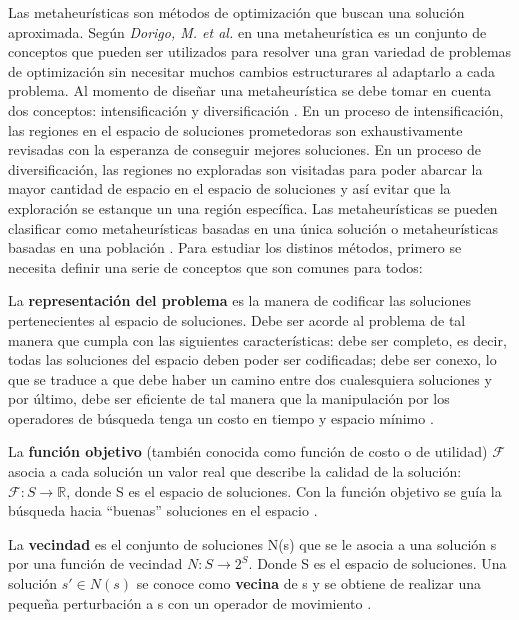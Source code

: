 Las metaheurísticas son métodos de optimización que buscan una solución aproximada. Según \emph{Dorigo, M. et al.} en \cite{Dorigo2017} una metaheurística es un conjunto de conceptos que pueden ser utilizados para resolver una gran variedad de problemas de optimización sin necesitar muchos cambios estructurares al adaptarlo a cada problema. Al momento de diseñar una metaheurística se debe tomar en cuenta dos conceptos: intensificación y diversificación \cite{talbi2009metaheuristics}. En un proceso de intensificación, las regiones en el espacio de soluciones prometedoras son exhaustivamente revisadas con la esperanza de conseguir mejores soluciones. En un proceso de diversificación, las regiones no exploradas son visitadas para poder abarcar la mayor cantidad de espacio en el espacio de soluciones y así evitar que la exploración se estanque un una región específica. Las metaheurísticas se pueden clasificar como metaheurísticas basadas en una única solución o metaheurísticas basadas en una población \cite{talbi2009metaheuristics}. Para estudiar los distinos métodos, primero se necesita definir una serie de conceptos que son comunes para todos:\\

\begin{definicion}
La \textbf{representación del problema} es la manera de codificar las soluciones pertenecientes al espacio de soluciones. Debe ser acorde al problema de tal manera que cumpla con las siguientes características: debe ser completo, es decir, todas las soluciones del espacio deben poder ser codificadas; debe ser conexo, lo que se traduce a que debe haber un camino entre dos cualesquiera soluciones y por último, debe ser eficiente de tal manera que la manipulación por los operadores de búsqueda tenga un costo en tiempo y espacio mínimo \cite{talbi2009metaheuristics}.\\
\end{definicion}

\begin{definicion}
La \textbf{función objetivo} (también conocida como función de costo o de utilidad) $\mathcal{F}$ asocia a cada solución un valor real que describe la calidad de la solución: $\mathcal{F}: S \rightarrow \mathbb{R}$, donde S es el espacio de soluciones. Con la función objetivo se guía la búsqueda hacia ``buenas'' soluciones en el espacio \cite{talbi2009metaheuristics}.\\
\end{definicion}

\begin{definicion}
La \textbf{vecindad} es el conjunto de soluciones N(s) que se le asocia a una solución s por una función de vecindad $N:S \rightarrow 2^S$. Donde S es el espacio de soluciones. Una solución $s' \in N(s)$ se conoce como \textbf{vecina} de s y se obtiene de realizar una pequeña perturbación a s con un operador de movimiento \cite{talbi2009metaheuristics}.   
\end{definicion}

